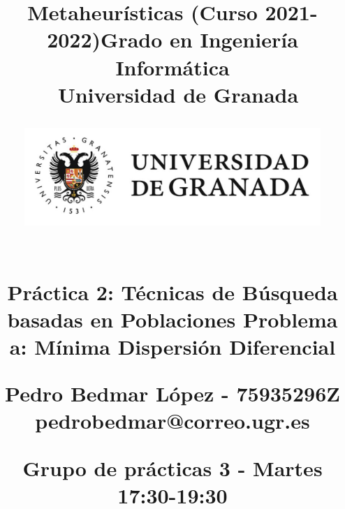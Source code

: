 



\title{	
\normalfont \normalsize 
\huge{\textbf{Metaheurísticas (Curso 2021-2022)}\linebreak \linebreak Grado en Ingeniería Informática \\ Universidad de Granada} \\ [23pt] %

\begin{figure}[H] %
    \centering
        \includegraphics[scale=0.4]{img/ugr.png}
\end{figure}

\horrule{0.5pt} \\[0.4cm] %
\huge Práctica 2: Técnicas de Búsqueda basadas en Poblaciones \linebreak \linebreak%
\LARGE Problema a: Mínima Dispersión Diferencial
\horrule{2pt} \\[0.5cm] %
\vspace{0.7cm}

\Large{Pedro Bedmar López - 75935296Z} \\
\Large{pedrobedmar@correo.ugr.es} \linebreak

\large Grupo de prácticas 3 - Martes 17:30-19:30

}

\date{}




